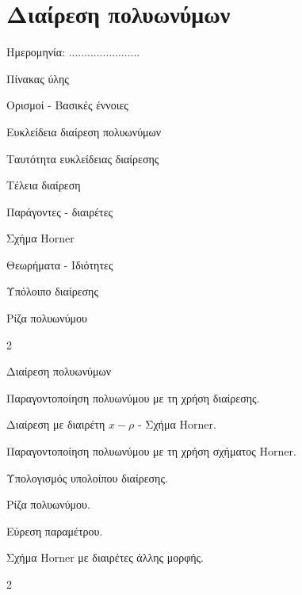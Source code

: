 \documentclass[twoside,nofonts,internet,math,spyros]{frontisthrio}
\newcommand{\myitem}{\stepcounter{enumi}\item[\raisebox{0.5mm}{\faEdit}\ \Large$\square$]}
\begin{document}
\section{Διαίρεση πολυωνύμων}
\begin{flushright}
\faCalendar* Ημερομηνία: .......................
\end{flushright}
\begin{mybox}[mysubtitle]{Πίνακας ύλης}
\begin{tcbraster}[raster columns=2,raster equal height]
\begin{myleftbox}{Ορισμοί - Βασικές έννοιες\ \ \faBook}
\begin{arithmisi}[itemsep=0mm]
\item Ευκλείδεια διαίρεση πολυωνύμων
\item Ταυτότητα ευκλείδειας διαίρεσης
\item Τέλεια διαίρεση
\item Παράγοντες - διαιρέτες
\item Σχήμα Horner
\end{arithmisi}
\end{myleftbox}
\begin{myrightbox}{Θεωρήματα - Ιδιότητες\ \ \faTools}
\begin{arithmisi}[itemsep=0mm]
\item Υπόλοιπο διαίρεσης
\item Ρίζα πολυωνύμου
\end{arithmisi}
\end{myrightbox}
\end{tcbraster}
\begin{multicols}{2}
\begin{todolist}[itemsep=0mm]
\item Διαίρεση πολυωνύμων
\item Παραγοντοποίηση πολυωνύμου με τη χρήση διαίρεσης.
\myitem Διαίρεση με διαιρέτη $x-\rho$ - Σχήμα Horner.
\myitem Παραγοντοποίηση πολυωνύμου με τη χρήση σχήματος Horner.
\item Υπολογισμός υπολοίπου διαίρεσης.
\item Ρίζα πολυωνύμου.
\item Εύρεση παραμέτρου.
\item Σχήμα Horner με διαιρέτες άλλης μορφής.
\end{todolist}
\end{multicols}
\begin{multicols}{2}

\end{multicols}
\end{mybox}
\end{document}
